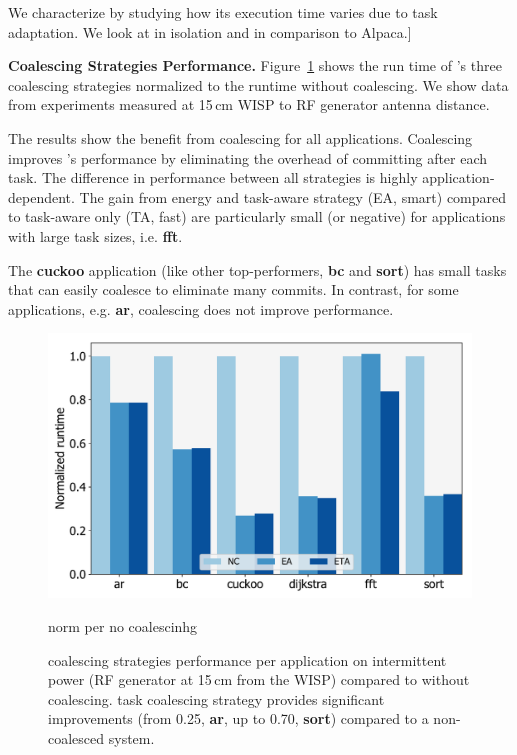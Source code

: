We characterize \sys by studying how its execution time varies due to task adaptation. We look at \sys in isolation and in comparison to Alpaca.]

\textbf{Coalescing Strategies Performance.}  Figure~\ref{fig:coalescing} shows the run time of \sys's three coalescing strategies normalized to the \sys runtime without coalescing.  We show data from experiments measured at 15\,cm WISP to RF generator antenna distance. 

The results show the benefit from coalescing for all applications. Coalescing improves \sys's performance by eliminating the overhead of committing after each task. The difference in performance between all strategies is highly application-dependent. The gain from energy and task-aware strategy (EA, smart) compared to task-aware only (TA, fast) are particularly small (or negative) for applications with large task sizes, i.e. \textbf{fft}. 

The \textbf{cuckoo} application (like other top-performers, \textbf{bc} and \textbf{sort}) has small tasks that \sys can easily coalesce to eliminate many commits. In contrast, for some applications, e.g. \textbf{ar}, coalescing does not improve performance. 


\begin{figure}
	\centering
	\includegraphics[width=0.5\columnwidth]{figures/coalStrategies}
	\caption{\sys coalescing strategies performance per application on intermittent power (RF generator at 15\,cm from the WISP) compared to \sys without coalescing. \sys task coalescing strategy provides significant improvements (from 0.25, \textbf{ar}, up to 0.70, \textbf{sort}) compared to a non-coalesced system.}
	\label{fig:coalescing} norm per no coalescinhg	
\end{figure}

